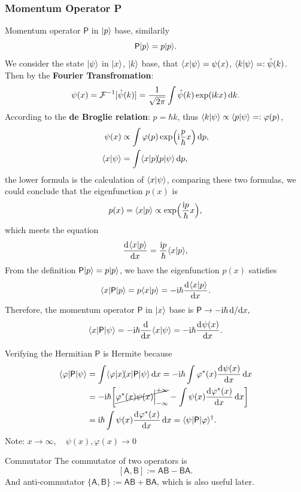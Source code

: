 \documentclass{article}
\newcommand*{\op}[1]{\mathsf{#1}}
\newcommand{\ko}[1]{\hspace{-#1 pt}}
\begin{document}
\subsubsection{Momentum Operator \textsf{P}}
Momentum operator $\op{P}$\index{momentum operator $\op{P}$} in $\lvert p\rangle$ base, similarily
$$\op{P}\ket p=p\ket p.$$
We consider the state $\lvert\psi\rangle$ in $\lvert x\rangle$, $\lvert k\rangle$ base, that $\langle x\vert\psi\rangle=\psi(x)$, $\langle k\vert\psi\rangle=:\hat\psi(k)$. Then by the \textbf{Fourier Transfromation}:
$$\psi(x)=\operatorname{\mathcal{F}}^{-1}[\hat\psi(k)]=\frac1{\sqrt{2\pi}}\int\hat\psi(k)\exp(\mathrm{i} kx)\mathop{}\!\mathrm{d} k.$$
According to the \textbf{de Broglie relation}: $p=\hbar k$, thus $\langle k\vert\psi\rangle\propto\langle p\vert\psi\rangle=:\varphi(p)$,
\begin{align*}
	\psi(x)     & \propto\int\varphi(p)\exp\Bigp{\i\frac p\hbar x}\d p, \\
	\brkt x\psi & =\int\brkt xp\ko3\brkt p\psi\d p,
\end{align*}
the lower formula is the calculation of $\langle x\vert\psi\rangle$, comparing these two formulas, we could conclude that the eigenfunction $p(x)$ is
$$p(x)=\langle x\vert p\rangle\propto\exp\Bigl(\frac{\mathrm{i} p}\hbar x\Bigr),$$
which meets the equation
$$\frac{\mathop{}\!\mathrm{d}^{}\langle x\vert p\rangle}{\mathrm{d}{x}^{}}=\frac{\mathrm{i} p}\hbar\langle x\vert p\rangle,$$
From the definition $\op{P}\ket p=p\ket p$, we have the eigenfunction $p(x)$ satisfies
$$\bra x\op{P}\ket p=p\brkt xp=-\i\hbar\dv{\brkt xp}x.$$
Therefore, the momentum operator $\op{P}$ in $\lvert x\rangle$ base is $\op{P}\to-\i\hbar\d/\nd x,$
$$\bra x\op{P}\ket\psi=-\i\hbar\dd x\brkt x\psi=-\i\hbar\dv{\psi(x)}x.$$
\begin{example}{Verifying the Hermitian}{}
	$\op{P}$ is Hermite because
	\begin{align*}
		\bra\varphi\op{P}\ket\psi & =\int\brkt\varphi{x}\ko3\bra x\op{P}\ket\psi\d x=-\i\hbar\int\varphi\conj(x)\dv{\psi(x)}x\d x                       \\
		                       & =-\i\hbar\biggl[\cancel{\varphi\conj(x)\psi(x)\Big|_{-\infty}^{+\infty}}-\int\psi(x)\dv{\varphi\conj(x)}x\d x\biggr] \\
		                       & =\i\hbar\int\psi(x)\dv{\varphi\conj(x)}x\d x=\bra\psi\op{P}\ket\varphi\adjoint.
	\end{align*}
	Note: $x\to\infty,\quad\psi(x),\varphi(x)\to0$
\end{example}
\begin{definition}{Commutator}{}
	The commutator of two operators is
	$$[\op{A},\op{B}]:=\op{A}\op{B}-\op{B}\op{A}.$$
	And anti-commutator $\{\op{A},\op{B}\}:=\op{A}\op{B}+\op{B}\op{A}$, which is also useful later.
\end{definition}
\end{document}
